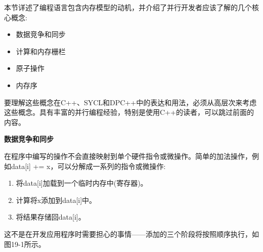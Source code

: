 本节详述了编程语言包含内存模型的动机，并介绍了并行开发者应该了解的几个核心概念:\par

\begin{itemize}
	\item 数据竞争和同步
	\item 计算和内存栅栏
	\item 原子操作
	\item 内存序
\end{itemize}

要理解这些概念在C++、SYCL和DPC++中的表达和用法，必须从高层次来考虑这些概念。具有丰富的并行编程经验，特别是使用C++的读者，可以跳过前面的内容。\par

\hspace*{\fill} \par %
\textbf{数据竞争和同步}

在程序中编写的操作不会直接映射到单个硬件指令或微操作。简单的加法操作，例如data[i] += x，可以分解成一系列的指令或微操作:\par

\begin{enumerate}
	\item 将data[i]加载到一个临时内存中(寄存器)。
	\item 计算将x添加到data[i]中。
	\item 将结果存储回data[i]。
\end{enumerate}

这不是在开发应用程序时需要担心的事情——添加的三个阶段将按照顺序执行，如图19-1所示。\par

